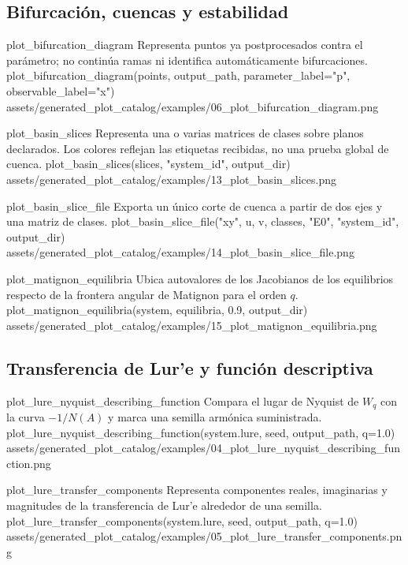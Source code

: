 \subsection{Bifurcación, cuencas y estabilidad}

\plotcatalogentry
  {plot_bifurcation_diagram}
  {Representa puntos ya postprocesados contra el parámetro; no continúa ramas
  ni identifica automáticamente bifurcaciones.}
  {plot_bifurcation_diagram(points, output_path, parameter_label="p", observable_label="x")}
  {assets/generated_plot_catalog/examples/06_plot_bifurcation_diagram.png}

\plotcatalogentry
  {plot_basin_slices}
  {Representa una o varias matrices de clases sobre planos declarados. Los
  colores reflejan las etiquetas recibidas, no una prueba global de cuenca.}
  {plot_basin_slices(slices, "system_id", output_dir)}
  {assets/generated_plot_catalog/examples/13_plot_basin_slices.png}

\plotcatalogentry
  {plot_basin_slice_file}
  {Exporta un único corte de cuenca a partir de dos ejes y una matriz de
  clases.}
  {plot_basin_slice_file("xy", u, v, classes, "E0", "system_id", output_dir)}
  {assets/generated_plot_catalog/examples/14_plot_basin_slice_file.png}

\plotcatalogentry
  {plot_matignon_equilibria}
  {Ubica autovalores de los Jacobianos de los equilibrios respecto de la
  frontera angular de Matignon para el orden \(q\).}
  {plot_matignon_equilibria(system, equilibria, 0.9, output_dir)}
  {assets/generated_plot_catalog/examples/15_plot_matignon_equilibria.png}

\subsection{Transferencia de Lur'e y función descriptiva}

\plotcatalogentry
  {plot_lure_nyquist_describing_function}
  {Compara el lugar de Nyquist de \(W_q\) con la curva
  \(-1/N(A)\) y marca una semilla armónica suministrada.}
  {plot_lure_nyquist_describing_function(system.lure, seed, output_path, q=1.0)}
  {assets/generated_plot_catalog/examples/04_plot_lure_nyquist_describing_function.png}

\plotcatalogentry
  {plot_lure_transfer_components}
  {Representa componentes reales, imaginarias y magnitudes de la transferencia
  de Lur'e alrededor de una semilla.}
  {plot_lure_transfer_components(system.lure, seed, output_path, q=1.0)}
  {assets/generated_plot_catalog/examples/05_plot_lure_transfer_components.png}

